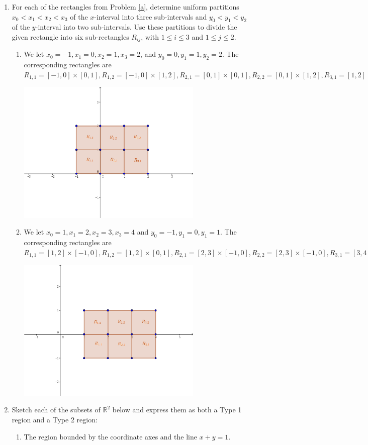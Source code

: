 \documentclass[letterpaper,12pt]{article}
\newcommand{\R}{\mathbb{R}}
\begin{document}
\begin{enumerate}
\begin{multicols}{2}
\begin{enumerate}
\end{enumerate}
\end{multicols}
 \item For each of the rectangles from Problem \ref{a}, determine uniform partitions $x_0<x_1<x_2<x_3$ of the $x$-interval into three sub-intervals and $y_0<y_1<y_2$ of the $y$-interval into two sub-intervals. Use these partitions to divide the given rectangle into six sub-rectangles $R_{ij}$, with $1\leq i\leq 3$ and $1\leq j\leq 2$. 

\begin{enumerate}
 \item We let $x_0=-1, x_1=0, x_2=1, x_3=2$, and $y_0=0, y_1=1, y_2=2$. The corresponding rectangles are $R_{1,1}=[-1,0]\times [0,1], R_{1,2} = [-1,0]\times [1,2], R_{2,1} = [0,1]\times [0,1], R_{2,2} = [0,1]\times [1,2], R_{3,1} = [1,2]\times [0,1], R_{3,2} = [1,2]\times [1,2].$
\begin{center}
 \includegraphics[width=3.5in]{Q10-3a.png}
\end{center}
 \item We let $x_0=1, x_1=2, x_2=3, x_3=4$ and $y_0=-1, y_1 = 0, y_1 = 1$. The corresponding rectangles are $R_{1,1}=[1,2]\times [-1,0], R_{1,2} = [1,2]\times [0,1], R_{2,1} = [2,3]\times [-1,0], R_{2,2} = [2,3]\times [-1,0], R_{3,1} = [3,4]\times [-1,0], R_{3,3} = [3,4]\times [0,1].$
\begin{center}
 \includegraphics[width=3.5in]{Q10-3b.png}
\end{center}
\end{enumerate}
\pagebreak
 \item Sketch each of the subsets of $\R^2$ below and express them as both a Type 1 region and a Type 2 region:
\begin{enumerate}
 \item The region bounded by the coordinate axes and the line $x+y=1$.


\end{enumerate}
\end{enumerate}
\end{document}
